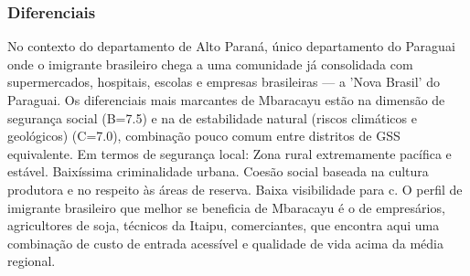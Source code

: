 \subsubsection*{Diferenciais}\label{dif-mbaracayu-1017}
No contexto do departamento de Alto Paraná, único departamento do Paraguai onde o imigrante brasileiro chega a uma comunidade já consolidada com supermercados, hospitais, escolas e empresas brasileiras — a 'Nova Brasil' do Paraguai. Os diferenciais mais marcantes de Mbaracayu estão na dimensão de segurança social (B=7.5) e na de estabilidade natural (riscos climáticos e geológicos) (C=7.0), combinação pouco comum entre distritos de GSS equivalente. Em termos de segurança local: Zona rural extremamente pacífica e estável. Baixíssima criminalidade urbana. Coesão social baseada na cultura produtora e no respeito às áreas de reserva. Baixa visibilidade para c. O perfil de imigrante brasileiro que melhor se beneficia de Mbaracayu é o de empresários, agricultores de soja, técnicos da Itaipu, comerciantes, que encontra aqui uma combinação de custo de entrada acessível e qualidade de vida acima da média regional.
